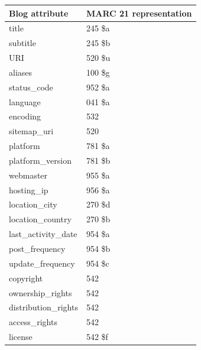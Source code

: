 \begin{table}
{\begin{tabular}{@{}ll@{}} \toprule
\textbf{Blog attribute} & \textbf{MARC 21 representation} \\ \hline
title & 245 \$a \\
subtitle & 245 \$b \\
URI & 520 \$u\\
aliases & 100 \$g \\
status\_code & 952 \$a\\
language & 041 \$a\\
encoding & 532\\
sitemap\_uri & 520\\
platform & 781 \$a\\
platform\_version & 781 \$b\\
webmaster & 955 \$a\\
hosting\_ip & 956 \$a\\
location\_city & 270 \$d\\
location\_country & 270 \$b\\
last\_activity\_date & 954 \$a\\
post\_frequency & 954 \$b\\
update\_frequency & 954 \$c\\
copyright & 542\\
ownership\_rights & 542\\
distribution\_rights & 542\\
access\_rights & 542\\
license & 542 \$f\\ \hline
\end{tabular}}
\label{table:blog-record-attributes}
\end{table}

